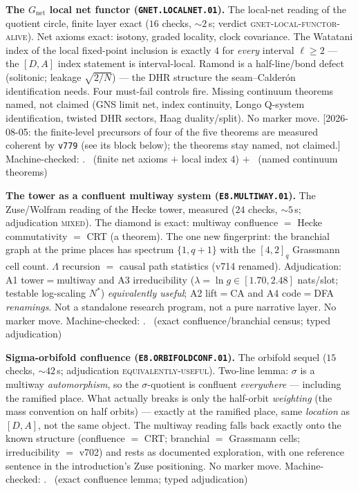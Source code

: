 \documentclass[11pt,a4paper]{article}
\theoremstyle{definition}
\begin{document}
\par\smallskip\noindent\textbf{The $G_{\mathrm{net}}$ local net
functor (\texttt{GNET.LOCALNET.01}).}
The local-net reading of the quotient circle, finite layer exact
($16$ checks, ${\sim}2$\,s; verdict
\textsc{gnet-local-functor-alive}).  Net axioms exact: isotony,
graded locality, clock covariance.  The Watatani index of the local
fixed-point inclusion is exactly $4$ for \emph{every} interval
$\ell\ge2$ --- the $[D,A]$ index statement is interval-local.
Ramond is a half-line/bond defect (solitonic; leakage
$\sqrt{2/N}$) --- the DHR structure the seam--Calder\'on
identification needs.  Four must-fail controls fire.  Missing
continuum theorems named, not claimed (GNS limit net, index
continuity, Longo Q-system identification, twisted DHR sectors,
Haag duality/split).  No marker move.  [2026-08-05: the
finite-level precursors of four of the five theorems are measured
coherent by \texttt{v779} (see its block below); the theorems stay
named, not claimed.]
Machine-checked: .
\mE\ (finite net axioms $+$ local index $4$) $+$ \mC\ (named
continuum theorems)
\par\smallskip

\par\smallskip\noindent\textbf{The tower as a confluent multiway
system (\texttt{E8.MULTIWAY.01}).}
The Zuse/Wolfram reading of the Hecke tower, measured ($24$ checks,
${\sim}5$\,s; adjudication \textsc{mixed}).  The diamond is exact:
multiway confluence $=$ Hecke commutativity $=$ CRT (a theorem).
The one new fingerprint: the branchial graph at the prime places
has spectrum $\{1,q{+}1\}$ with the $[4,2]_q$ Grassmann cell count.
$\Lambda$ recursion $=$ causal path statistics (v714 renamed).
Adjudication: A1 tower$=$multiway and A3 irreducibility
($\lambda=\ln g\in[1.70,2.48]$ nats/slot; testable log-scaling
$N^*$) \emph{equivalently useful}; A2 lift$=$CA and A4 code$=$DFA
\emph{renamings}.  Not a standalone research program, not a pure
narrative layer.  No marker move.
Machine-checked: .
\mE\ (exact confluence/branchial census; typed adjudication)
\par\smallskip

\par\smallskip\noindent\textbf{Sigma-orbifold confluence
(\texttt{E8.ORBIFOLDCONF.01}).}
The orbifold sequel ($15$ checks, ${\sim}42$\,s; adjudication
\textsc{equivalently-useful}).  Two-line lemma: $\sigma$ is a
multiway \emph{automorphism}, so the $\sigma$-quotient is confluent
\emph{everywhere} --- including the ramified place.  What actually
breaks is only the half-orbit \emph{weighting} (the mass convention
on half orbits) --- exactly at the ramified place, same
\emph{location} as $[D,A]$, not the same object.  The multiway
reading falls back exactly onto the known structure (confluence $=$
CRT; branchial $=$ Grassmann cells; irreducibility $=$ v702) and
rests as documented exploration, with one reference sentence in the
introduction's Zuse positioning.  No marker move.
Machine-checked:
.
\mE\ (exact confluence lemma; typed adjudication)
\par\smallskip
\end{document}
